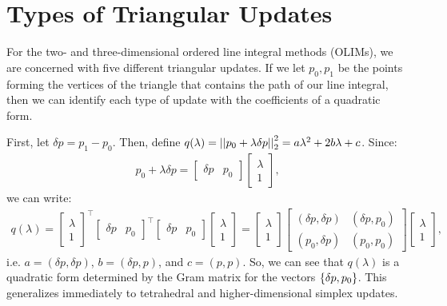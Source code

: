 \documentclass{article}
\begin{document}
\large

\section{Types of Triangular Updates}

For the two- and three-dimensional ordered line integral methods
(OLIMs), we are concerned with five different triangular updates. If
we let $p_0, p_1$ be the points forming the vertices of the triangle
that contains the path of our line integral, then we can identify each
type of update with the coefficients of a quadratic form.

First, let $\delta p = p_1 - p_0$. Then, define
$q(\lambda) = \left|\left|p_0 + \lambda \delta p\right|\right|_2^2 = a\lambda^2 +
2b\lambda + c$. Since:
\begin{align*}
  p_0 + \lambda \delta p = \begin{bmatrix} \delta p & p_0 \end{bmatrix} \begin{bmatrix} \lambda \\ 1 \end{bmatrix},
\end{align*}
we can write:
\begin{align*}
  q(\lambda) = \begin{bmatrix} \lambda \\ 1 \end{bmatrix}^\top \begin{bmatrix} \delta p & p_0 \end{bmatrix}^\top \begin{bmatrix} \delta p & p_0 \end{bmatrix} \begin{bmatrix} \lambda \\ 1 \end{bmatrix} = \begin{bmatrix} \lambda \\ 1 \end{bmatrix} \begin{bmatrix} (\delta p, \delta p) & (\delta p, p_0) \\ (p_0, \delta p) & (p_0, p_0) \end{bmatrix} \begin{bmatrix} \lambda \\ 1 \end{bmatrix},
\end{align*}
i.e. $a = (\delta p, \delta p)$, $b = (\delta p, p)$, and
$c = (p, p)$. So, we can see that $q(\lambda)$ is a quadratic form
determined by the Gram matrix for the vectors $\left\{\delta p,
  p_0\right\}$. This generalizes immediately to tetrahedral and
higher-dimensional simplex updates.
\end{document}
